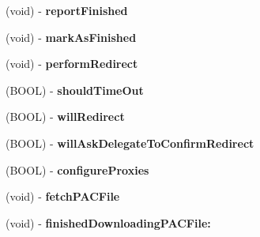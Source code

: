 \begin{DoxyCompactItemize}
\item 
\hypertarget{interface_a_s_i_h_t_t_p_request_07_08_aec6fbf664802e3be7fd4c24a9824e219}{
(void) -\/ {\bfseries report\-Finished}}
\label{interface_a_s_i_h_t_t_p_request_07_08_aec6fbf664802e3be7fd4c24a9824e219}

\item 
\hypertarget{interface_a_s_i_h_t_t_p_request_07_08_a3218690ab3ce9d401f26f7e0d0e2c995}{
(void) -\/ {\bfseries mark\-As\-Finished}}
\label{interface_a_s_i_h_t_t_p_request_07_08_a3218690ab3ce9d401f26f7e0d0e2c995}

\item 
\hypertarget{interface_a_s_i_h_t_t_p_request_07_08_a2862f6f1db8f1146e96470f926561b93}{
(void) -\/ {\bfseries perform\-Redirect}}
\label{interface_a_s_i_h_t_t_p_request_07_08_a2862f6f1db8f1146e96470f926561b93}

\item 
\hypertarget{interface_a_s_i_h_t_t_p_request_07_08_acedb1516f19af14df7b44602b700bae3}{
(\-B\-O\-O\-L) -\/ {\bfseries should\-Time\-Out}}
\label{interface_a_s_i_h_t_t_p_request_07_08_acedb1516f19af14df7b44602b700bae3}

\item 
\hypertarget{interface_a_s_i_h_t_t_p_request_07_08_af19d1ede897c67a86b4d8a62c6395863}{
(\-B\-O\-O\-L) -\/ {\bfseries will\-Redirect}}
\label{interface_a_s_i_h_t_t_p_request_07_08_af19d1ede897c67a86b4d8a62c6395863}

\item 
\hypertarget{interface_a_s_i_h_t_t_p_request_07_08_a38bb6d3bfc36a47f3ace0665762660ae}{
(\-B\-O\-O\-L) -\/ {\bfseries will\-Ask\-Delegate\-To\-Confirm\-Redirect}}
\label{interface_a_s_i_h_t_t_p_request_07_08_a38bb6d3bfc36a47f3ace0665762660ae}

\item 
\hypertarget{interface_a_s_i_h_t_t_p_request_07_08_a81e707733dd891e98faf51eb37093845}{
(\-B\-O\-O\-L) -\/ {\bfseries configure\-Proxies}}
\label{interface_a_s_i_h_t_t_p_request_07_08_a81e707733dd891e98faf51eb37093845}

\item 
\hypertarget{interface_a_s_i_h_t_t_p_request_07_08_a88a7f8b0dfa6f7cc8214d8b52282c6e6}{
(void) -\/ {\bfseries fetch\-P\-A\-C\-File}}
\label{interface_a_s_i_h_t_t_p_request_07_08_a88a7f8b0dfa6f7cc8214d8b52282c6e6}

\item 
\hypertarget{interface_a_s_i_h_t_t_p_request_07_08_af285a652c6aa3f3b35d7e38d81cac828}{
(void) -\/ {\bfseries finished\-Downloading\-P\-A\-C\-File\-:}}
\label{interface_a_s_i_h_t_t_p_request_07_08_af285a652c6aa3f3b35d7e38d81cac828}


\end{DoxyCompactItemize}
